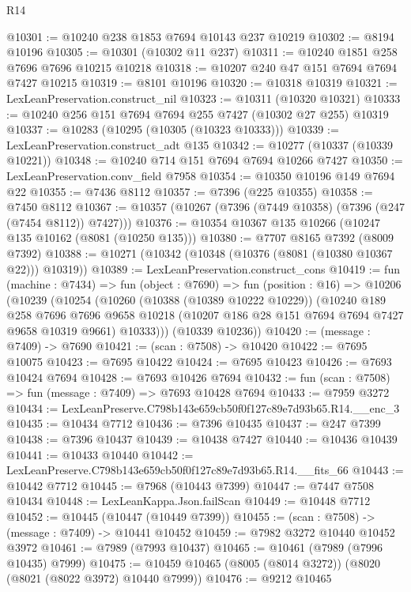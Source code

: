 \begin{lexlean}{R14}
\begin{coremodule}
@10301 := @10240 @238 @1853 @7694 @10143 @237 @10219
@10302 := @8194 @10196
@10305 := @10301 (@10302 @11 @237)
@10311 := @10240 @1851 @258 @7696 @7696 @10215 @10218
@10318 := @10207 @240 @47 @151 @7694 @7694 @7427 @10215
@10319 := @8101 @10196
@10320 := @10318 @10319
@10321 := LexLeanPreservation.construct_nil
@10323 := @10311 (@10320 @10321)
@10333 := @10240 @256 @151 @7694 @7694 @255 @7427 (@10302 @27 @255) @10319
@10337 := @10283 (@10295 (@10305 (@10323 @10333)))
@10339 := LexLeanPreservation.construct_adt @135
@10342 := @10277 (@10337 (@10339 @10221))
@10348 := @10240 @714 @151 @7694 @7694 @10266 @7427
@10350 := LexLeanPreservation.conv_field @7958
@10354 := @10350 @10196 @149 @7694 @22
@10355 := @7436 @8112
@10357 := @7396 (@225 @10355)
@10358 := @7450 @8112
@10367 := @10357 (@10267 (@7396 (@7449 @10358) (@7396 (@247 (@7454 @8112)) @7427)))
@10376 := @10354 @10367 @135 @10266 (@10247 @135 @10162 (@8081 (@10250 @135)))
@10380 := @7707 @8165 @7392 (@8009 @7392)
@10388 := @10271 (@10342 (@10348 (@10376 (@8081 (@10380 @10367 @22))) @10319))
@10389 := LexLeanPreservation.construct_cons
@10419 := fun (machine : @7434) =>
  fun (object : @7690) =>
  fun (position : @16) =>
  @10206
    (@10239
      (@10254
        (@10260
          (@10388 (@10389 @10222 @10229))
          (@10240
            @189
            @258
            @7696
            @7696
            @9658
            @10218
            (@10207 @186 @28 @151 @7694 @7694 @7427 @9658 @10319 @9661)
            @10333)))
      (@10339 @10236))
@10420 := (message : @7409) -> @7690
@10421 := (scan : @7508) -> @10420
@10422 := @7695 @10075
@10423 := @7695 @10422
@10424 := @7695 @10423
@10426 := @7693 @10424 @7694
@10428 := @7693 @10426 @7694
@10432 := fun (scan : @7508) => fun (message : @7409) => @7693 @10428 @7694
@10433 := @7959 @3272
@10434 := LexLeanPreserve.C798b143e659cb50f0f127c89e7d93b65.R14.__enc_3
@10435 := @10434 @7712
@10436 := @7396 @10435
@10437 := @247 @7399
@10438 := @7396 @10437
@10439 := @10438 @7427
@10440 := @10436 @10439
@10441 := @10433 @10440
@10442 := LexLeanPreserve.C798b143e659cb50f0f127c89e7d93b65.R14.__fits_66
@10443 := @10442 @7712
@10445 := @7968 (@10443 @7399)
@10447 := @7447 @7508 @10434
@10448 := LexLeanKappa.Json.failScan
@10449 := @10448 @7712
@10452 := @10445 (@10447 (@10449 @7399))
@10455 := (scan : @7508) -> (message : @7409) -> @10441 @10452
@10459 := @7982 @3272 @10440 @10452 @3972
@10461 := @7989 (@7993 @10437)
@10465 := @10461 (@7989 (@7996 @10435) @7999)
@10475 := @10459 @10465 (@8005 (@8014 @3272)) (@8020 (@8021 (@8022 @3972) @10440 @7999))
@10476 := @9212 @10465

\end{coremodule}
\end{lexlean}
